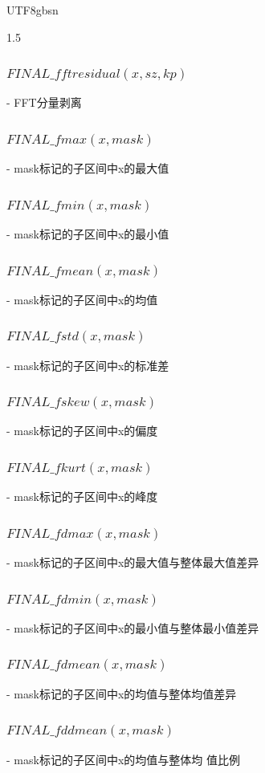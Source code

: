 \documentclass{article}
\begin{document}
\begin{CJK}{UTF8}{gbsn}
\begin{spacing}{1.5}
\subsubsection{$FINAL\_fftresidual(x, sz, kp)$}       
   - FFT分量剥离        
\subsubsection{$FINAL\_fmax(x, mask)$}                
   - mask标记的子区间中x的最大值       
\subsubsection{$FINAL\_fmin(x, mask)$}                
   - mask标记的子区间中x的最小值       
\subsubsection{$FINAL\_fmean(x, mask)$}               
   - mask标记的子区间中x的均值         
\subsubsection{$FINAL\_fstd(x, mask)$}                
   - mask标记的子区间中x的标准差       
\subsubsection{$FINAL\_fskew(x, mask)$}               
   - mask标记的子区间中x的偏度        
\subsubsection{$FINAL\_fkurt(x, mask)$}               
   - mask标记的子区间中x的峰度         
\subsubsection{$FINAL\_fdmax(x, mask)$}               
   - mask标记的子区间中x的最大值与整体最大值差异   
\subsubsection{$FINAL\_fdmin(x, mask)$}               
   - mask标记的子区间中x的最小值与整体最小值差异  
\subsubsection{$FINAL\_fdmean(x, mask)$}              
   - mask标记的子区间中x的均值与整体均值差异       
\subsubsection{$FINAL\_fddmean(x, mask)$}             
   - mask标记的子区间中x的均值与整体均 值比例      

\end{spacing}
\end{CJK}
\end{document}
